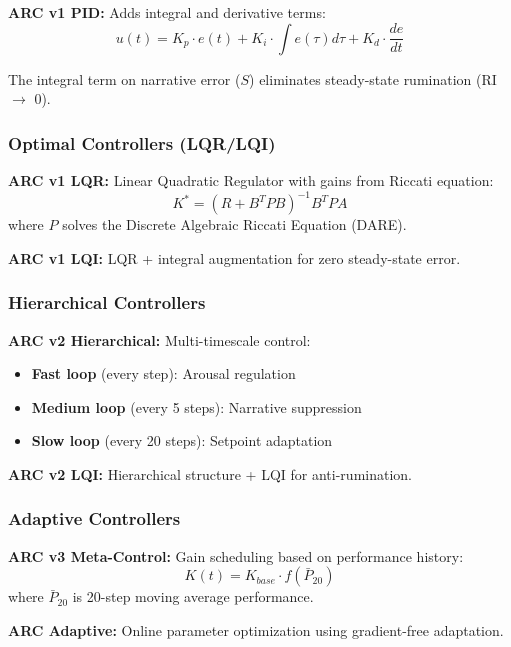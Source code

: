 \documentclass{article}
\begin{document}
\textbf{ARC v1 PID:} Adds integral and derivative terms:
\begin{equation}
u(t) = K_p \cdot e(t) + K_i \cdot \int e(\tau) d\tau + K_d \cdot \frac{de}{dt}
\end{equation}

The integral term on narrative error ($S$) eliminates steady-state rumination (RI $\to$ 0).

\subsubsection{Optimal Controllers (LQR/LQI)}

\textbf{ARC v1 LQR:} Linear Quadratic Regulator with gains from Riccati equation:
\begin{equation}
K^* = (R + B^T P B)^{-1} B^T P A
\end{equation}
where $P$ solves the Discrete Algebraic Riccati Equation (DARE).

\textbf{ARC v1 LQI:} LQR + integral augmentation for zero steady-state error.

\subsubsection{Hierarchical Controllers}

\textbf{ARC v2 Hierarchical:} Multi-timescale control:
\begin{itemize}
    \item \textbf{Fast loop} (every step): Arousal regulation
    \item \textbf{Medium loop} (every 5 steps): Narrative suppression
    \item \textbf{Slow loop} (every 20 steps): Setpoint adaptation
\end{itemize}

\textbf{ARC v2 LQI:} Hierarchical structure + LQI for anti-rumination.

\subsubsection{Adaptive Controllers}

\textbf{ARC v3 Meta-Control:} Gain scheduling based on performance history:
\begin{equation}
K(t) = K_{base} \cdot f(\bar{P}_{20})
\end{equation}
where $\bar{P}_{20}$ is 20-step moving average performance.

\textbf{ARC Adaptive:} Online parameter optimization using gradient-free adaptation.
\end{document}
